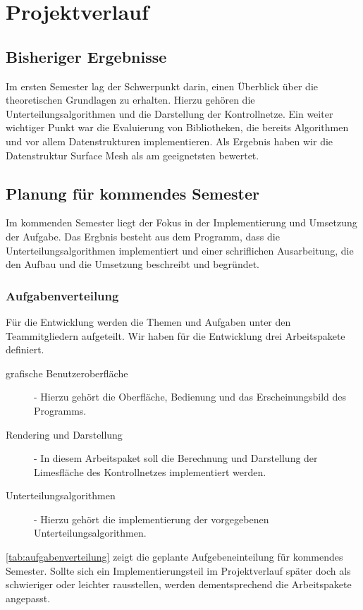 \chapter{Projektverlauf}


\section{Bisheriger Ergebnisse}

Im ersten Semester lag der Schwerpunkt darin, einen Überblick über die theoretischen Grundlagen
zu erhalten. Hierzu gehören die Unterteilungsalgorithmen und die Darstellung der Kontrollnetze.
Ein weiter wichtiger Punkt war die Evaluierung von Bibliotheken, die bereits Algorithmen und
vor allem Datenstrukturen implementieren. Als Ergebnis haben wir die Datenstruktur
Surface Mesh als am geeignetsten bewertet.

\section{Planung für kommendes Semester}

Im kommenden Semester liegt der Fokus in der Implementierung und Umsetzung der Aufgabe.
Das Ergbnis besteht aus dem Programm, dass die Unterteilungsalgorithmen implementiert
und einer schriflichen Ausarbeitung, die den Aufbau und die Umsetzung beschreibt und begründet.

\subsection*{Aufgabenverteilung}
Für die Entwicklung werden die Themen und Aufgaben unter den Teammitgliedern aufgeteilt.
Wir haben für die Entwicklung drei Arbeitspakete definiert.

\begin{description}
\item[grafische Benutzeroberfläche] - Hierzu gehört die Oberfläche, Bedienung und das
Erscheinungsbild des Programms.
\item[Rendering und Darstellung] - In diesem Arbeitspaket soll die Berechnung und Darstellung der
Limesfläche des Kontrollnetzes implementiert werden.
\item[Unterteilungsalgorithmen] - Hierzu gehört die implementierung der vorgegebenen
Unterteilungsalgorithmen.
\end{description}

\autoref{tab:aufgabenverteilung} zeigt die geplante Aufgebeneinteilung für kommendes Semester.
Sollte sich ein Implementierungsteil im Projektverlauf später doch als schwieriger oder
leichter rausstellen, werden dementsprechend die Arbeitspakete angepasst. 

